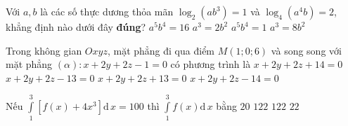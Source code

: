 \begin{ex}%
Với $a, b$ là các số thực dương thỏa mãn $\log _2\left(a b^3\right)=1$ và $\log _4\left(a^4 b\right)=2$, khẳng định nào dưới đây \textbf{đúng}?
\choice
{  $a^5 b^4=16$}
{  $a^3=2 b^2$}
{ $a^5 b^4=1$}
{\True $a^3=8 b^2$}
\end{ex}

\begin{ex}%
Trong không gian $O x y z$, mặt phẳng đi qua điểm $M(1 ; 0 ; 6)$ và song song với mặt phẳng $(\alpha)\colon x+2 y+2 z-1=0$ có phương trình là
\choice
{ $x+2 y+2 z+14=0$}
{\True $x+2 y+2 z-13=0$}
{ $x+2 y+2 z+13=0$}
{$x+2 y+2 z-14=0$}
\end{ex}

\begin{ex}%
Nếu $\displaystyle\int\limits_1^3\left[f(x)+4 x^3\right] \mathrm{d\,}x=100$ thì $\displaystyle\int\limits_1^3 f(x)\mathrm{d\,} x$ bằng
\choice
{\True $20$}
{$122$}
{$122$}
{$22$}
\end{ex}


